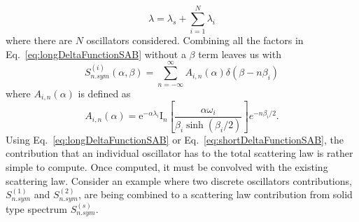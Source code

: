 \documentclass[../master.tex]{subfiles}
\begin{document}
                                \begin{equation}
                                        \lambda=\lambda_{s}+\sum_{i=1}^{N}\lambda_{i}
                                \end{equation}
                                where there are $N$ oscillators considered. Combining all the factors in Eq.~\ref{eq:longDeltaFunctionSAB} without a $\beta$ term leaves us with
				\begin{equation}
                                  S^{(i)}_{n.sym}(\alpha,\beta)=\sum_{n=-\infty}^{\infty}A_{i,n}(\alpha)\delta\left(\beta-n\beta_{i}\right)\label{eq:shortDeltaFunctionSAB}
				\end{equation}
                                where $A_{i,n}(\alpha)$ is defined as 
                                \begin{equation}
                                  A_{i,n}(\alpha)=\mathrm{e}^{-\alpha\lambda_i}\mathrm{I}_n\left[\frac{\alpha\omega_i}{\beta_i\sinh(\beta_i/2)}\right]e^{-n\beta_i/2}.
                                \end{equation}
                                Using Eq.~\ref{eq:longDeltaFunctionSAB} or Eq.~\ref{eq:shortDeltaFunctionSAB}, the contribution that an individual oscillator has to the total scattering law is rather simple to compute. Once computed, it must be convolved with the existing scattering law. Consider an example where two discrete oscillators contributions, $S^{(1)}_{n.sym}$ and $S^{(2)}_{n.sym}$, are being combined to a scattering law contribution from solid type spectrum $S^{(s)}_{n.sym}$.
\end{document}
